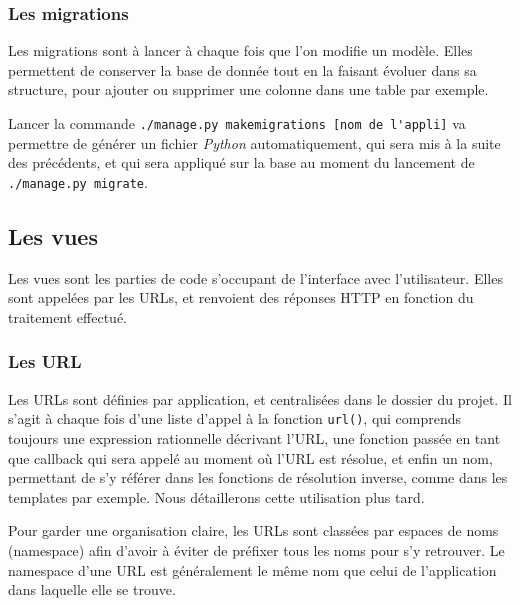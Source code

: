 \documentclass[a4paper]{report}
\begin{document}
\subsubsection{Les migrations}
\label{ssub:Les migrations}
\par Les migrations sont à lancer à chaque fois que l'on modifie un modèle. Elles permettent de conserver la base de
donnée tout en la faisant évoluer dans sa structure, pour ajouter ou supprimer une colonne dans une table par exemple.
\par Lancer la commande \verb#./manage.py makemigrations [nom de l'appli]# va permettre de générer un fichier \emph{Python}
automatiquement, qui sera mis à la suite des précédents, et qui sera appliqué sur la base au moment du lancement de
\verb#./manage.py migrate#.

\subsection{Les vues}
\label{sub:les_vues}
\par Les vues sont les parties de code s'occupant de l'interface avec l'utilisateur. Elles sont appelées par les URLs,
et renvoient des réponses HTTP en fonction du traitement effectué.

\subsubsection{Les URL}
\label{ssub:Les URL}
\par Les URLs sont définies par application, et centralisées dans le dossier du projet. Il s'agit à chaque fois d'une
liste d'appel à la fonction \verb#url()#, qui comprends toujours une expression rationnelle décrivant l'URL, une
fonction passée en tant que callback qui sera appelé au moment où l'URL est résolue, et enfin un nom, permettant de s'y
référer dans les fonctions de résolution inverse, comme dans les templates par exemple. Nous détaillerons cette
utilisation plus tard.

\par Pour garder une organisation claire, les URLs sont classées par espaces de noms (namespace) afin d'avoir à éviter
de préfixer tous les noms pour s'y retrouver. Le namespace d'une URL est généralement le même nom que celui de
l'application dans laquelle elle se trouve.
\end{document}
